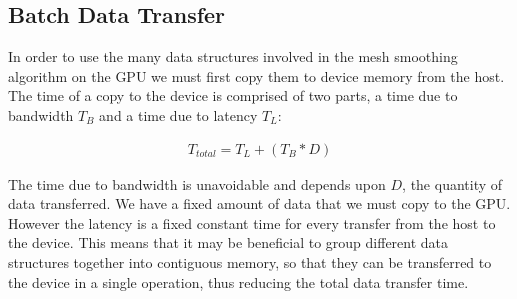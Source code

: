 \subsection{Batch Data Transfer}
In order to use the many data structures involved in the mesh smoothing algorithm on the GPU we must first copy them to device memory from the host. The time of a copy to the device is comprised of two parts, a time due to bandwidth \begin{math}T_B\end{math} and a time due to latency \begin{math}T_L\end{math}\cite{transfer2}:

\begin{align*}
T_\mathit{total} = T_L + (T_B*D)
\end{align*}

The time due to bandwidth is unavoidable and depends upon \begin{math}D\end{math}, the quantity of data transferred. We have a fixed amount of data that we must copy to the GPU. However the latency is a fixed constant time for every transfer from the host to the device. This means that it may be beneficial to group different data structures together into contiguous memory, so that they can be transferred to the device in a single operation, thus reducing the total data transfer time.